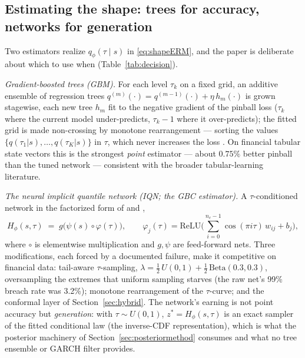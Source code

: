 \documentclass[11pt]{article}
\theoremstyle{remark}
\begin{document}
\subsection{Estimating the shape: trees for accuracy, networks for
generation}\label{sec:gbcmethod}

Two estimators realize $q_\phi(\tau\mid s)$ in \eqref{eq:shapeERM}, and
the paper is deliberate about which to use when (Table~\ref{tab:decision}).

\emph{Gradient-boosted trees (GBM).} For each level $\tau_k$ on a fixed
grid, an additive ensemble of regression trees
$q^{(m)}(\cdot) = q^{(m-1)}(\cdot) + \eta\, h_m(\cdot)$ is grown
stagewise, each new tree $h_m$ fit to the negative gradient of the
pinball loss ($\tau_k$ where the current model under-predicts,
$\tau_k - 1$ where it over-predicts); the fitted grid is made
non-crossing by monotone rearrangement --- sorting the values
$\{q(\tau_1|s),\dots,q(\tau_K|s)\}$ in $\tau$, which never increases the
loss \citep{cherno2010rearr}. On financial tabular state
vectors this is the strongest \emph{point} estimator --- about $0.75\%$
better pinball than the tuned network --- consistent with the broader
tabular-learning literature.

\emph{The neural implicit quantile network (IQN; the GBC estimator).} A
$\tau$-conditioned network
in the factorized form of \citet{dabney2018iqn} and
\citet{polson2023gbc},
\begin{equation}
H_\phi(s,\tau) \;=\; g\big(\psi(s)\circ\varphi(\tau)\big),
\qquad
\varphi_j(\tau) = \mathrm{ReLU}\Big(\textstyle\sum_{i=0}^{n_c-1}
\cos(\pi i \tau)\, w_{ij} + b_j\Big),
\label{eq:iqn}
\end{equation}
where $\circ$ is elementwise multiplication and $g,\psi$ are
feed-forward nets. Three modifications, each forced by a documented
failure, make it competitive on financial data: tail-aware
$\tau$-sampling, $\lambda = \tfrac12\,U(0,1) +
\tfrac12\,\mathrm{Beta}(0.3,0.3)$, oversampling the extremes that
uniform sampling starves (the raw net's 99\% breach rate was 3.2\%);
monotone rearrangement of the $\tau$-curve; and the conformal layer of
Section~\ref{sec:hybrid}. The network's earning is not point accuracy
but \emph{generation}: with $\tau\sim U(0,1)$,
$z^{*} = H_\phi(s,\tau)$ is an exact sampler of the fitted conditional
law (the inverse-CDF representation), which is what the posterior
machinery of Section~\ref{sec:posteriormethod} consumes and what no
tree ensemble or GARCH filter provides.
\end{document}
